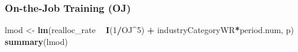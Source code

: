 \documentclass[
]{article}
\newenvironment{Shaded}{\begin{snugshade}}{\end{snugshade}}
\newcommand{\DecValTok}[1]{\textcolor[rgb]{0.00,0.00,0.81}{#1}}
\newcommand{\KeywordTok}[1]{\textcolor[rgb]{0.13,0.29,0.53}{\textbf{#1}}}
\newcommand{\NormalTok}[1]{#1}
\newcommand{\OperatorTok}[1]{\textcolor[rgb]{0.81,0.36,0.00}{\textbf{#1}}}
\newcommand{\StringTok}[1]{\textcolor[rgb]{0.31,0.60,0.02}{#1}}
\begin{document}
\hypertarget{on-the-job-training-oj-1}{%
\subsubsection{On-the-Job Training
(OJ)}\label{on-the-job-training-oj-1}}

\begin{Shaded}
\begin{Highlighting}[]
\NormalTok{lmod <-}\StringTok{ }\KeywordTok{lm}\NormalTok{(realloc_rate }\OperatorTok{~}\StringTok{ }\KeywordTok{I}\NormalTok{(}\DecValTok{1}\OperatorTok{/}\NormalTok{OJ}\OperatorTok{^}\DecValTok{5}\NormalTok{) }\OperatorTok{+}\StringTok{ }\NormalTok{industryCategoryWR}\OperatorTok{*}\NormalTok{period.num, p)}
\KeywordTok{summary}\NormalTok{(lmod)}
\end{Highlighting}
\end{Shaded}
\end{document}
